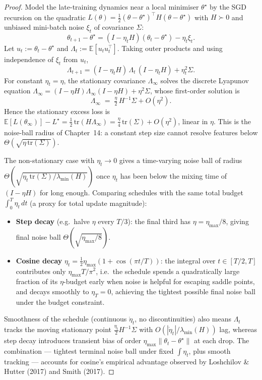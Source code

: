 \begin{proof}
Model the late-training dynamics near a local minimiser $\theta^\star$ by the SGD recursion on the quadratic $L(\theta) = \tfrac{1}{2}(\theta - \theta^\star)^\top H (\theta - \theta^\star)$ with $H \succ 0$ and unbiased mini-batch noise $\xi_t$ of covariance $\Sigma$:
\[
  \theta_{t+1} - \theta^\star = (I - \eta_t H)(\theta_t - \theta^\star) - \eta_t \xi_t.
\]
Let $u_t := \theta_t - \theta^\star$ and $\Lambda_t := \mathbb{E}[u_t u_t^\top]$. Taking outer products and using independence of $\xi_t$ from $u_t$,
\[
  \Lambda_{t+1} = (I - \eta_t H)\, \Lambda_t\, (I - \eta_t H) + \eta_t^2 \Sigma.
\]
For constant $\eta_t = \eta$, the stationary covariance $\Lambda_\infty$ solves the discrete Lyapunov equation $\Lambda_\infty = (I-\eta H)\Lambda_\infty(I-\eta H) + \eta^2 \Sigma$, whose first-order solution is
\[
  \Lambda_\infty \;=\; \tfrac{\eta}{2}\, H^{-1} \Sigma + O(\eta^2).
\]
Hence the stationary excess loss is $\mathbb{E}[L(\theta_\infty)] - L^\star = \tfrac{1}{2}\,\mathrm{tr}(H \Lambda_\infty) = \tfrac{\eta}{4}\,\mathrm{tr}(\Sigma) + O(\eta^2)$, linear in $\eta$. This is the noise-ball radius of Chapter~14: a constant step size cannot resolve features below $\Theta(\sqrt{\eta\,\mathrm{tr}(\Sigma)})$.

The non-stationary case with $\eta_t \to 0$ gives a time-varying noise ball of radius $\Theta(\sqrt{\eta_t \,\mathrm{tr}(\Sigma) / \lambda_{\min}(H)})$ once $\eta_t$ has been below the mixing time of $(I - \eta H)$ for long enough. Comparing schedules with the same total budget $\int_0^T \eta_t \, dt$ (a proxy for total update magnitude):
\begin{itemize}
  \item \textbf{Step decay} (e.g.\ halve $\eta$ every $T/3$): the final third has $\eta = \eta_{\max}/8$, giving final noise ball $\Theta(\sqrt{\eta_{\max}/8})$.
  \item \textbf{Cosine decay} $\eta_t = \tfrac{1}{2}\eta_{\max}(1 + \cos(\pi t/T))$: the integral over $t \in [T/2, T]$ contributes only $\eta_{\max} T / \pi^2$, i.e.\ the schedule spends a quadratically large fraction of its $\eta$-budget early when noise is helpful for escaping saddle points, and decays smoothly to $\eta_T = 0$, achieving the tightest possible final noise ball under the budget constraint.
\end{itemize}
Smoothness of the schedule (continuous $\dot\eta_t$, no discontinuities) also means $\Lambda_t$ tracks the moving stationary point $\tfrac{\eta_t}{2} H^{-1}\Sigma$ with $O(|\dot\eta_t|/\lambda_{\min}(H))$ lag, whereas step decay introduces transient bias of order $\eta_{\max}\|\theta_t - \theta^\star\|$ at each drop. The combination --- tightest terminal noise ball under fixed $\int \eta_t$, plus smooth tracking --- accounts for cosine's empirical advantage observed by Loshchilov \& Hutter (2017) and Smith (2017).
\end{proof}

